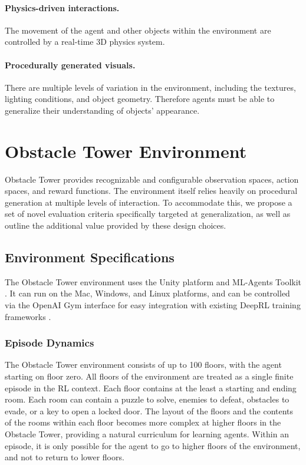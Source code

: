 \documentclass{article}
\begin{document}
\paragraph{Physics-driven interactions.} The movement of the agent and other objects within the environment are controlled by a real-time 3D physics system.
\paragraph{Procedurally generated visuals.} There are multiple levels of variation in the environment, including the textures, lighting conditions, and object geometry. Therefore agents must be able to generalize their understanding of objects' appearance. 

\section{Obstacle Tower Environment}


Obstacle Tower provides recognizable and configurable observation spaces, action spaces, and reward functions. The environment itself relies heavily on procedural generation at multiple levels of interaction. To accommodate this, we propose a set of novel evaluation criteria specifically targeted at generalization, as well as outline the additional value provided by these design choices.

\subsection{Environment Specifications}

The Obstacle Tower environment uses the Unity platform and ML-Agents Toolkit \cite{juliani2018unity}. It can run on the Mac, Windows, and Linux platforms, and can be controlled via the OpenAI Gym interface for easy integration with existing DeepRL training frameworks \cite{brockman2016openai}.

\subsubsection{Episode Dynamics} The Obstacle Tower environment consists of up to 100 floors, with the agent starting on floor zero. All floors of the environment are treated as a single finite episode in the RL context. Each floor contains at the least a starting and ending room. Each room can contain a puzzle to solve, enemies to defeat, obstacles to evade, or a key to open a locked door. The layout of the floors and the contents of the rooms within each floor becomes more complex at higher floors in the Obstacle Tower, providing a natural curriculum for learning agents. Within an episode, it is only possible for the agent to go to higher floors of the environment, and not to return to lower floors. 
\end{document}
